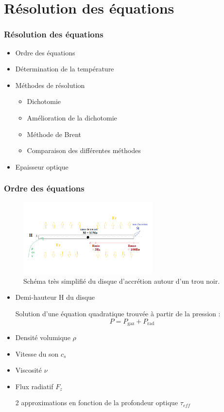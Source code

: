 \documentclass[french]{beamer}
\begin{document}
\section{Résolution des équations}
\begin{frame}
\frametitle{Résolution des équations}

   \begin{itemize}
      \item Ordre des équations
      \item Détermination de la température
      \item Méthodes de résolution
         \begin{itemize} 
            \item Dichotomie
            \item Amélioration de la dichotomie
            \item Méthode de Brent
            \item Comparaison des différentes méthodes
         \end{itemize}
      \item Epaisseur optique
   \end{itemize}
\end{frame}


\begin{frame}
\frametitle{Ordre des équations}

   \begin{figure}[htb!]
      \includegraphics[width=7cm]{figures/bob_ross.png}
      \caption{Schéma très simplifié du disque d'accrétion autour d'un trou noir.}
   \end{figure}

   \begin{itemize}
      \item Demi-hauteur H du disque

      Solution d'une équation quadratique trouvée à partir de la pression :
      \begin{equation}
         P = P_\mathrm{gaz} + P_\mathrm{rad}
      \end{equation}
      
      \item Densité volumique $\rho$
      \item Vitesse du son $c_s$ 
      \item Viscosité $\nu$ 
      \item Flux radiatif $F_z$
      
      2 approximations en fonction de la profondeur optique $\tau_{eff}$
   \end{itemize}
\end{frame}
\end{document}
